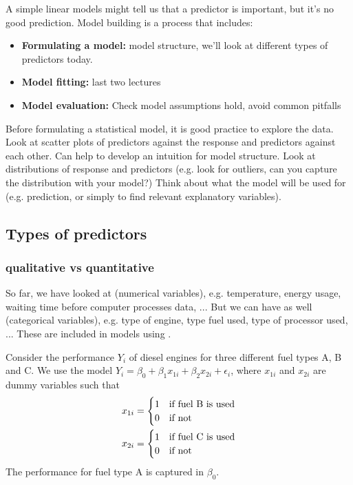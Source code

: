 A simple linear models might tell us that a predictor is important, but it's no good prediction. Model building is a process that includes:
\begin{itemize}
	\item \textbf{Formulating a model:} model structure, we'll look at different types of predictors today.
	\item \textbf{Model fitting:} last two lectures
	\item \textbf{Model evaluation:} Check model assumptions hold, avoid common pitfalls
\end{itemize}

Before formulating a statistical model, it is good practice to explore the data. Look at scatter plots of predictors against the response and predictors against each other. Can help to develop an intuition for model structure. Look at distributions of response and predictors (e.g. look for outliers, can you capture the distribution with your model?) Think about what the model will be used for (e.g. prediction, or simply to find relevant explanatory variables).

\subsection{Types of predictors}

\subsubsection{qualitative vs quantitative}

So far, we have looked at  (numerical variables), e.g. temperature, energy usage, waiting time before computer processes data, ... But we can have  as well (categorical variables), e.g. type of engine, type fuel used, type of processor used, ... These are included in models using .

\begin{example}
	Consider the performance $Y_i$ of diesel engines for three different fuel types A, B and C. We use the model $Y_i = \beta_0 + \beta_1x_{1i} + \beta_2x_{2i} + \epsilon_i$, where $x_{1i}$ and $x_{2i}$ are dummy variables such that
	\begin{align}
		x_{1i} &= \begin{cases}
		1 & \text{if fuel B is used} \\ 0 & \text{if not}
		\end{cases} \notag \\
		x_{2i} &= \begin{cases}
		1 & \text{if fuel C is used} \\ 0 & \text{if not}
		\end{cases} \notag 
	\end{align}
	The performance for fuel type A is captured in $\beta_0$.
\end{example}

